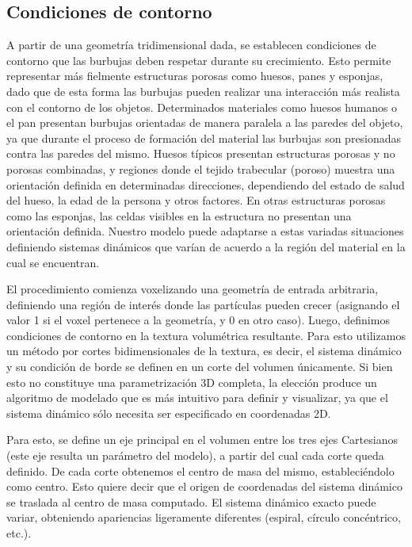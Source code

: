 \subsection{Condiciones de contorno}
A partir de una geometría tridimensional dada, se establecen condiciones de contorno que las burbujas deben respetar durante su crecimiento.
Esto permite representar más fielmente estructuras porosas como huesos, panes y esponjas, dado que de esta forma las burbujas pueden realizar una interacción más realista con el contorno de los objetos.
Determinados materiales como huesos humanos o el pan presentan burbujas orientadas de manera paralela a las paredes del objeto, ya que durante el proceso de formación del material las burbujas son presionadas contra las paredes del mismo.
Huesos típicos presentan estructuras porosas y no porosas combinadas, y regiones donde el tejido trabecular (poroso) muestra una orientación definida en determinadas direcciones, dependiendo del estado de salud del hueso, la edad de la persona y otros factores.
En otras estructuras porosas como las esponjas, las celdas visibles en la estructura no presentan una orientación definida.
Nuestro modelo puede adaptarse a estas variadas situaciones definiendo sistemas dinámicos que varían de acuerdo a la región del material en la cual se encuentran.

El procedimiento comienza voxelizando una geometría de entrada arbitraria, definiendo una región de interés donde las partículas pueden crecer (asignando el valor 1 si el voxel pertenece a la geometría, y 0 en otro caso).
Luego, definimos condiciones de contorno en la textura volumétrica resultante.
Para esto utilizamos un método por cortes bidimensionales de la textura, es decir, el sistema dinámico y su condición de borde se definen en un corte del volumen únicamente.
Si bien esto no constituye una parametrización 3D completa, la elección produce un algoritmo de modelado que es más intuitivo para definir y visualizar, ya que el sistema dinámico sólo necesita ser especificado en coordenadas 2D.

Para esto, se define un eje principal en el volumen entre los tres ejes Cartesianos (este eje resulta un parámetro del modelo), a partir del cual cada corte queda definido.
De cada corte obtenemos el centro de masa del mismo, estableciéndolo como centro.
Esto quiere decir que el origen de coordenadas del sistema dinámico se traslada al centro de masa computado.
El sistema dinámico exacto puede variar, obteniendo apariencias ligeramente diferentes (espiral, círculo concéntrico, etc.).

